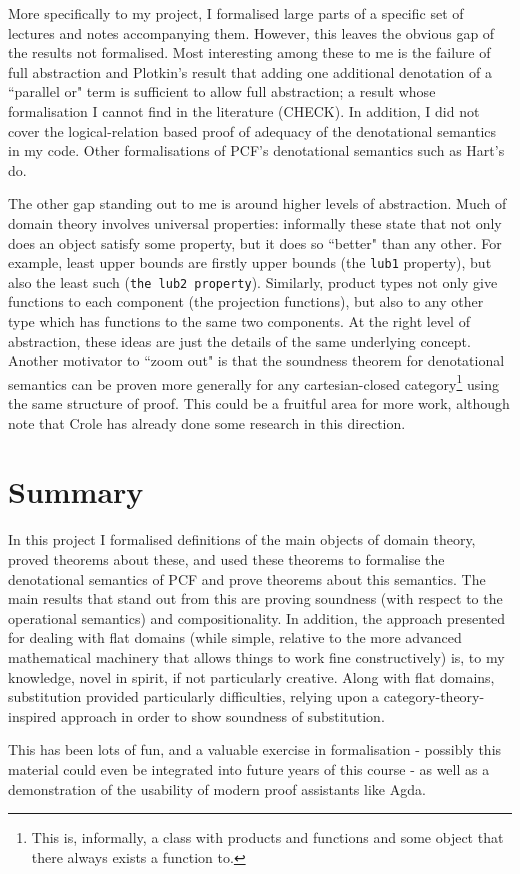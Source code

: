 \documentclass[12pt,a4paper,twoside,openright]{report}
\begin{document}
More specifically to my project, I formalised large parts of a specific set of lectures and notes accompanying them. However, this leaves the obvious gap of the results not formalised. Most interesting among these to me is the failure of full abstraction and Plotkin's result \cite{Plotkin} that adding one additional denotation of a ``parallel or" term is sufficient to allow full abstraction; a result whose formalisation I cannot find in the literature (CHECK). In addition, I did not cover the logical-relation based proof of adequacy of the denotational semantics in my code. Other formalisations of PCF's denotational semantics such as Hart's \cite{Hart} do. 

The other gap standing out to me is around higher levels of abstraction. Much of domain theory involves universal properties: informally these state that not only does an object satisfy some property, but it does so ``better" than any other. For example, least upper bounds are firstly upper bounds (the \texttt{lub1} property), but also the least such (\texttt{the lub2 property}). Similarly, product types not only give functions to each component (the projection functions), but also to any other type which has functions to the same two components. At the right level of abstraction, these ideas are just the details of the same underlying concept. Another motivator to ``zoom out" is that the soundness theorem for denotational semantics can be proven more generally for any cartesian-closed category\footnote{This is, informally, a class with products and functions and some object that there always exists a function to.} using the same structure of proof. This could be a fruitful area for more work, although note that Crole \cite{Crole} has already done some research in this direction. 
\section{Summary}
In this project I formalised definitions of the main objects of domain theory, proved theorems about these, and used these theorems to formalise the denotational semantics of PCF and prove theorems about this semantics. The main results that stand out from this are proving soundness (with respect to the operational semantics) and compositionality. In addition, the approach presented for dealing with flat domains (while simple, relative to the more advanced mathematical machinery that allows things to work fine constructively) is, to my knowledge, novel in spirit, if not particularly creative. Along with flat domains, substitution provided particularly difficulties, relying upon a category-theory-inspired approach in order to show soundness of substitution. 

This has been lots of fun, and a valuable exercise in formalisation - possibly this material could even be integrated into future years of this course - as well as a demonstration of the usability of modern proof assistants like Agda. 

\end{document}
